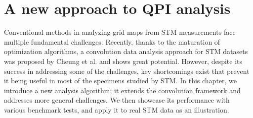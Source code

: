 \chapter{A new approach to QPI analysis}
Conventional methods in analyzing grid maps from STM measurements face multiple fundamental  challenges. Recently, thanks to the maturation of optimization algorithms, a convolution data analysis approach for STM datasets was proposed by Cheung et al.\cite{cheungDictionaryLearningFouriertransform2020} and shows great potential. However,  despite its success in addressing some of the challenges, key shortcomings exist that prevent it being useful in most of the specimens studied by STM. In this chapter, we introduce a new analysis algorithm; it extends the convolution framework and addresses more general challenges. We then showcase its performance with various benchmark tests, and apply it to real STM data as an illustration.  












